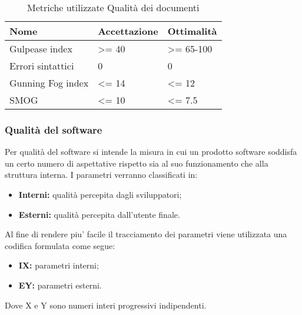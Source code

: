 \begin{table}[H]
	\centering
	\renewcommand{\arraystretch}{2} 
		\begin{tabular}{|l|l|l|}
			\rowcolor{orange!50}
			\hline
			\textbf{Nome} & \textbf{Accettazione} & \textbf{Ottimalità} \\ \hline
			Gulpease index    &   \textgreater= 40   &     \textgreater= 65-100       \\ \hline
			Errori sintattici     &  0    &   0      \\ \hline
			Gunning Fog index    &     \textless= 14       &   \textless= 12   \\ \hline
			SMOG                  &              \textless= 10                                 &                         \textless= 7.5                   \\ \hline
		\end{tabular}
	\caption{Metriche utilizzate Qualità dei documenti}
\end{table}
\subsubsection{Qualità del software}
Per qualità del software si intende la misura in cui un prodotto software soddisfa un certo numero di aspettative rispetto sia al suo funzionamento che alla struttura interna. I parametri verranno classificati in:
\begin{itemize}
	\item{\textbf{Interni:} qualità percepita dagli sviluppatori;}
	\item{\textbf{Esterni:} qualità percepita dall'utente finale.}
\end{itemize}
Al fine di rendere piu' facile il tracciamento dei parametri viene utilizzata una codifica formulata come segue:
\begin{itemize}
	\item{\textbf{IX:} parametri interni;}
	\item{\textbf{EY:} parametri esterni.}
\end{itemize}
Dove X e Y sono numeri interi progressivi indipendenti.



